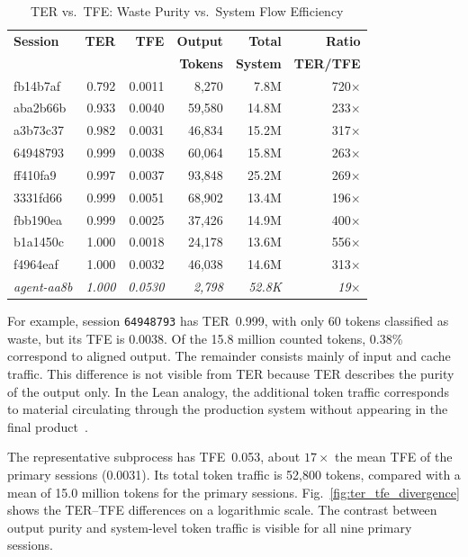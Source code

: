 \documentclass[journal]{IEEEtran}
\begin{document}
\begin{table}[t]
\centering
\caption{TER vs.\ TFE: Waste Purity vs.\ System Flow Efficiency}
\label{tab:tfe_vs_ter}
\begin{tabular}{@{}lrrrrr@{}}
\toprule
\textbf{Session} & \textbf{TER} & \textbf{TFE} & \textbf{Output} & \textbf{Total} & \textbf{Ratio} \\
                 &              &              & \textbf{Tokens} & \textbf{System} & \textbf{TER/TFE} \\
\midrule
fb14b7af & 0.792 & 0.0011 & 8,270  & 7.8M  & 720$\times$ \\
aba2b66b & 0.933 & 0.0040 & 59,580 & 14.8M & 233$\times$ \\
a3b73c37 & 0.982 & 0.0031 & 46,834 & 15.2M & 317$\times$ \\
64948793 & 0.999 & 0.0038 & 60,064 & 15.8M & 263$\times$ \\
ff410fa9 & 0.997 & 0.0037 & 93,848 & 25.2M & 269$\times$ \\
3331fd66 & 0.999 & 0.0051 & 68,902 & 13.4M & 196$\times$ \\
fbb190ea & 0.999 & 0.0025 & 37,426 & 14.9M & 400$\times$ \\
b1a1450c & 1.000 & 0.0018 & 24,178 & 13.6M & 556$\times$ \\
f4964eaf & 1.000 & 0.0032 & 46,038 & 14.6M & 313$\times$ \\
\midrule
\textit{agent-aa8b} & \textit{1.000} & \textit{0.0530} & \textit{2,798} & \textit{52.8K} & \textit{19$\times$} \\
\bottomrule
\end{tabular}
\end{table}

For example, session \texttt{64948793} has TER~0.999, with only 60 tokens classified as waste, but its TFE is 0.0038. Of the 15.8 million counted tokens, 0.38\% correspond to aligned output. The remainder consists mainly of input and cache traffic. This difference is not visible from TER because TER describes the purity of the output only. In the Lean analogy, the additional token traffic corresponds to material circulating through the production system without appearing in the final product~\cite{womack1996}.

The representative subprocess has TFE~0.053, about $17\times$ the mean TFE of the primary sessions (0.0031). Its total token traffic is 52,800 tokens, compared with a mean of 15.0 million tokens for the primary sessions. Fig.~\ref{fig:ter_tfe_divergence} shows the TER--TFE differences on a logarithmic scale. The contrast between output purity and system-level token traffic is visible for all nine primary sessions.
\end{document}

